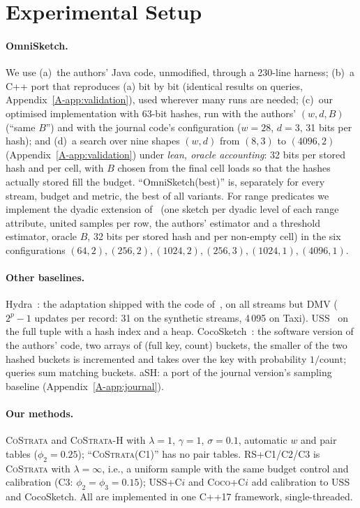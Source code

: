 \documentclass[sigconf]{acmart}
\newcommand{\cs}{\textsc{CoStrata}\xspace}
\newcommand{\csh}{\textsc{CoStrata-H}\xspace}
\newcommand{\omni}{OmniSketch\xspace}
\newcommand{\apx}[1]{Appendix~\ref{A-#1}}
\begin{document}
\section{Experimental Setup}\label{sec:setup}

\paragraph{\omni.} We use (a)~the authors' Java code, unmodified, through a 230-line harness;
(b)~a C++ port that reproduces (a) bit by bit (identical results on \NumValQueries{} queries,
\apx{app:validation}), used wherever many runs are needed; (c)~our optimised implementation with 63-bit
hashes, run with the authors' $(w,d,B)$ (``same $B$'') and with the journal code's configuration
($w=28$, $d=3$, 31 bits per hash); and (d)~a search over nine shapes $(w,d)$ from $(8,3)$ to
$(4096,2)$ (\apx{app:validation}) under \emph{lean, oracle accounting}: 32 bits per stored hash and per
cell, with $B$ chosen from the final cell loads so that the hashes actually stored fill the budget. ``\omni (best)'' is, separately for every stream, budget
and metric, the best of all \NumOmniFamilySize{} variants. For range predicates we implement the dyadic
extension of~\cite{omni} (one sketch per dyadic level of each range attribute, united samples per row,
the authors' estimator and a threshold estimator, oracle $B$, 32 bits per stored hash and per non-empty
cell) in the six configurations $(64,2),(256,2),(1024,2),(256,3),(1024,1),(4096,1)$.

\paragraph{Other baselines.} Hydra~\cite{hydra}: the adaptation shipped with the code of~\cite{omni}, on
all streams but DMV ($2^p-1$ updates per record: 31 on the synthetic streams, 4\,095 on Taxi). USS~\cite{ting-uss} on the full tuple with a
hash index and a heap. CocoSketch~\cite{coco}: the software version of the authors' code, two arrays of
(full key, count) buckets, the smaller of the two hashed buckets is incremented and takes over the key with
probability $1/\text{count}$; queries sum matching buckets. aSH: a port of the journal version's sampling
baseline (\apx{app:journal}).

\paragraph{Our methods.} \cs and \csh with $\lambda=1$, $\gamma=1$, $\sigma=0.1$, automatic $w$ and pair
tables ($\phi_2=0.25$); ``\cs (C1)'' has no pair tables. \textsc{RS+C1}/\textsc{C2}/\textsc{C3} is \cs with
$\lambda=\infty$, i.e., a uniform sample with the same budget control and calibration (C3:
$\phi_2=\phi_3=0.15$); \textsc{USS+C$i$} and \textsc{Coco+C$i$} add calibration to USS and CocoSketch. All
are implemented in one C++17 framework, single-threaded.
\end{document}
